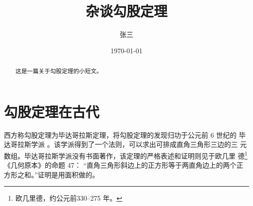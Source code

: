 \documentclass[UTF8]{ctexart} %
\title{\heiti 杂谈勾股定理}
\author{\kaishu 张三}
\date{\today}
\begin{document}
\maketitle	%
\begin{abstract}	%
	这是一篇关于勾股定理的小短文。
\end{abstract}	
\tableofcontents	%

\section{勾股定理在古代}
西方称勾股定理为毕达哥拉斯定理，将勾股定理的发现归功于公元前 6 世纪的
毕达哥拉斯学派 \cite{Kline}。该学派得到了一个法则，可以求出可排成直角三角形三边的三
元数组。毕达哥拉斯学派没有书面著作，该定理的严格表述和证明则见于欧几里
德\footnote{欧几里德，约公元前330--275 年。}《几何原本》的命题 47：
“直角三角形斜边上的正方形等于两直角边上的两个正方形之和。”证明是用面积做的。
\end{document}
